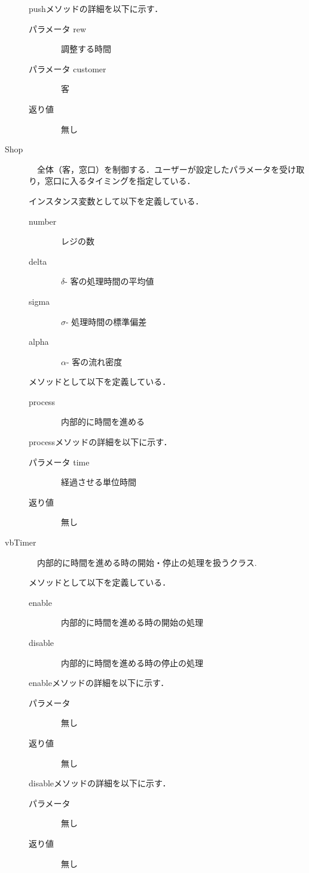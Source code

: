 \documentclass[12pt,a4j]{ltjsarticle}
\begin{document}
\begin{description}
pushメソッドの詳細を以下に示す．
\begin{description}
	\item[パラメータ rew]　調整する時間
	\item[パラメータ customer]　客
	\item[返り値]　無し
\end{description}
\vspace{10mm}
\clearpage


\item[Shop]　全体（客，窓口）を制御する．ユーザーが設定したパラメータを受け取り，窓口に入るタイミングを指定している．

インスタンス変数として以下を定義している．
\begin{description}
	\item[number]　レジの数
	\item[delta]　$\delta$- 客の処理時間の平均値
	\item[sigma]　$\sigma$- 処理時間の標準偏差
	\item[alpha] 　$\alpha$- 客の流れ密度
\end{description}
\vspace{5mm}

メソッドとして以下を定義している．
\begin{description}
	\item[process]　内部的に時間を進める
\end{description}
\vspace{5mm}

processメソッドの詳細を以下に示す．
\begin{description}
	\item[パラメータ time]　経過させる単位時間
	\item[返り値]　無し
\end{description}
\vspace{10mm}


\item[vbTimer]　内部的に時間を進める時の開始・停止の処理を扱うクラス.

メソッドとして以下を定義している．
\begin{description}
	\item[enable]　内部的に時間を進める時の開始の処理
	\item[disable]　内部的に時間を進める時の停止の処理
\end{description}
\vspace{5mm}

enableメソッドの詳細を以下に示す．
\begin{description}
	\item[パラメータ]　無し
	\item[返り値]　無し
\end{description}
\vspace{5mm}

disableメソッドの詳細を以下に示す．
\begin{description}
	\item[パラメータ]　無し
	\item[返り値]　無し
\end{description}

\end{description}
\end{document}
